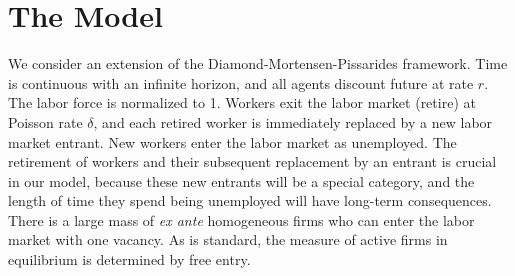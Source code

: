 \documentclass[12pt]{article} %
\theoremstyle{definition}
\begin{document}



\section{The Model}\label{section model}

We consider an extension of the Diamond-Mortensen-Pissarides framework. Time is continuous with an infinite horizon, and all agents discount future at rate $r$. The labor force is normalized to 1. Workers exit the labor market (retire) at Poisson rate $\delta$, and each retired worker is immediately replaced by a new labor market entrant.
New workers enter the labor market as unemployed. The retirement of workers and their subsequent replacement by an entrant is crucial in our model, because these new entrants will be a special category, and the length of time they spend being unemployed will have long-term consequences. There is a large mass of \textit{ex ante} homogeneous firms who can enter the labor market with one vacancy. As is standard, the measure of active firms in equilibrium is determined by free entry. 
\end{document}
